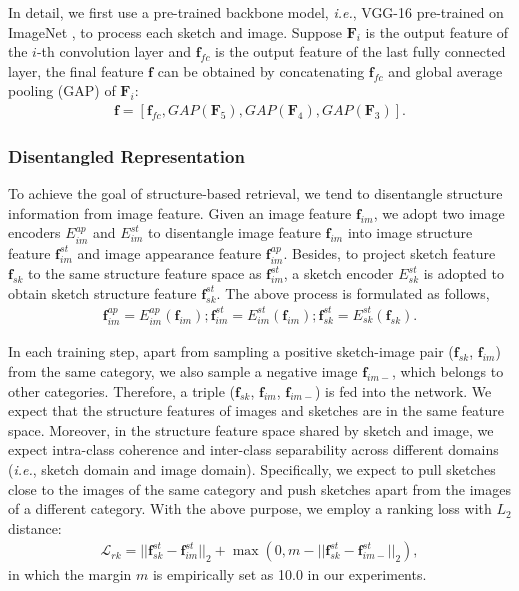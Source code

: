 \documentclass[10pt,twocolumn,letterpaper]{article}
\begin{document}
In detail, we first use a pre-trained backbone model, \emph{i.e.}, VGG-16 pre-trained on ImageNet \cite{deng2009imagenet}, to process each sketch and image. 
Suppose $\mathbf{F}_i$ is the output feature of the $i$-th convolution layer and $\mathbf{f}_{fc}$ is the output feature of the last fully connected layer, the final feature $\mathbf{f}$ can be obtained by concatenating $\mathbf{f}_{fc}$ and global average pooling (GAP) of $\mathbf{F}_i$:
\vspace{-10pt}
\begin{align}
\mathbf{f}\!=\![\mathbf{f}_{fc}, GAP(\mathbf{F}_5), GAP(\mathbf{F}_4), GAP(\mathbf{F}_3)].
\end{align}

\subsubsection{Disentangled Representation}
To achieve the goal of structure-based retrieval, we tend to disentangle structure information from image feature. 
Given an image feature $\mathbf{f}_{im}$, we adopt two image encoders $E_{im}^{ap}$ and $E_{im}^{st}$ to disentangle image feature $\mathbf{f}_{im}$ into image structure feature $\mathbf{f}_{im}^{st}$ and image appearance feature $\mathbf{f}_{im}^{ap}$. Besides, to project sketch feature $\mathbf{f}_{sk}$ to the same structure feature space as $\mathbf{f}_{im}^{st}$, a sketch encoder $E_{sk}^{st}$ is adopted to obtain sketch structure feature $\mathbf{f}_{sk}^{st}$. The above process is formulated as follows,
\vspace{-5pt}
\begin{align}
    \mathbf{f}_{im}^{ap} \!=\! E_{im}^{ap}(\mathbf{f}_{im}); \mathbf{f}_{im}^{st} \!=\! E_{im}^{st}(\mathbf{f}_{im}); \mathbf{f}_{sk}^{st} \!=\! E_{sk}^{st}(\mathbf{f}_{sk}).
\end{align}

In each training step, apart from sampling a positive sketch-image pair ($\mathbf{f}_{sk}$, $\mathbf{f}_{im}$) from the same category, we also sample a negative image $\mathbf{f}_{im-}$, which belongs to other categories. Therefore, a triple ($\mathbf{f}_{sk}$, $\mathbf{f}_{im}$, $\mathbf{f}_{im-}$) is fed into the network. We expect that the structure features of images and sketches are in the same feature space. Moreover, in the structure feature space shared by sketch and image, we expect intra-class coherence and inter-class separability across different domains (\emph{i.e.}, sketch domain and image domain). Specifically, we expect to pull sketches close to the images of the same category and push sketches apart from the images of a different category. With the above purpose, we employ a ranking loss with $L_2$ distance:
\vspace{-5pt}
\begin{align} \label{eqn:rank_loss}
        \mathcal{L}_{rk} \!=\! ||\mathbf{f}_{sk}^{st}\!-\!\mathbf{f}_{im}^{st}||_{2}\!+\!\max(0,\!m\!-\!||\mathbf{f}_{sk}^{st}\!-\!\mathbf{f}_{im-}^{st}||_{2}),
\end{align}
in which the margin $m$ is empirically set as 10.0 in our experiments.
\end{document}
